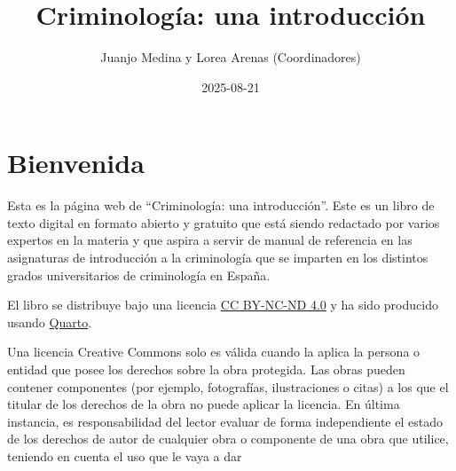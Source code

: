 \documentclass[
  spanish,
  letterpaper,
  DIV=11,
  numbers=noendperiod]{scrreprt}
\title{Criminología: una introducción}
\author{Juanjo Medina y Lorea Arenas (Coordinadores)}
\date{2025-08-21}
\renewcommand*\contentsname{Tabla de contenidos}
\newcommand\contentsname{Tabla de contenidos}
\begin{document}
\maketitle

\renewcommand*\contentsname{Tabla de contenidos}
{
\hypersetup{linkcolor=}
\setcounter{tocdepth}{2}
\tableofcontents
}


\chapter*{Bienvenida}\label{bienvenida}


Esta es la página web de ``Criminología: una introducción''. Este es un
libro de texto digital en formato abierto y gratuito que está siendo
redactado por varios expertos en la materia y que aspira a servir de
manual de referencia en las asignaturas de introducción a la
criminología que se imparten en los distintos grados universitarios de
criminología en España.

El libro se distribuye bajo una licencia
\href{https://creativecommons.org/licenses/by-nc-nd/4.0/deed.en}{CC
BY-NC-ND 4.0} y ha sido producido usando
\href{https://quarto.org/}{Quarto}.

\begin{tcolorbox}[enhanced jigsaw, bottomtitle=1mm, toprule=.15mm, colbacktitle=quarto-callout-note-color!10!white, bottomrule=.15mm, leftrule=.75mm, colframe=quarto-callout-note-color-frame, opacitybacktitle=0.6, titlerule=0mm, breakable, colback=white, left=2mm, arc=.35mm, title=\textcolor{quarto-callout-note-color}{\faInfo}\hspace{0.5em}{Nota}, toptitle=1mm, coltitle=black, rightrule=.15mm, opacityback=0]

Una licencia Creative Commons solo es válida cuando la aplica la persona
o entidad que posee los derechos sobre la obra protegida. Las obras
pueden contener componentes (por ejemplo, fotografías, ilustraciones o
citas) a los que el titular de los derechos de la obra no puede aplicar
la licencia. En última instancia, es responsabilidad del lector evaluar
de forma independiente el estado de los derechos de autor de cualquier
obra o componente de una obra que utilice, teniendo en cuenta el uso que
le vaya a dar

\end{tcolorbox}
\end{document}
